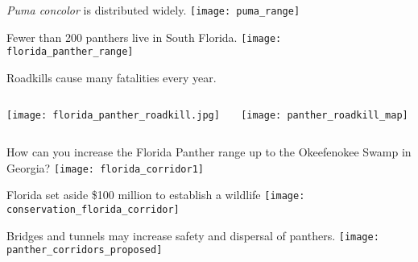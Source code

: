 \documentclass[t]{beamer}
\begin{document}
{
\begin{frame}[plain]
\end{frame}
}

\begin{frame}[plain]{\textit{Puma concolor} is distributed widely.}
	\centering%
		\texttt{[image: puma\_range]}
\end{frame}

%

\begin{frame}[plain]{Fewer than 200 panthers live in South Florida.}
	\centering%
		\texttt{[image: florida\_panther\_range]}
\end{frame}

\begin{frame}[plain]{Roadkills cause many fatalities every year.}
	\begin{columns}[T]%
		\begin{column}{0.4\textwidth}%
			\centering%
			\texttt{[image: florida\_panther\_roadkill.jpg]}
		\end{column}
		\begin{column}{0.55\textwidth}%
			\centering%
			\texttt{[image: panther\_roadkill\_map]}
		\end{column}
	\end{columns}
\end{frame}


{
\begin{frame}[plain]
\end{frame}
}

\begin{frame}[plain]{How can you increase the Florida Panther range up to the Okeefenokee Swamp in Georgia?}
	\centering%
		\texttt{[image: florida\_corridor1]}
\end{frame}

\begin{frame}[plain]{Florida set aside \$100 million to establish a wildlife }
	\centering%
		\texttt{[image: conservation\_florida\_corridor]}
\end{frame}


\begin{frame}[plain]{Bridges and tunnels may increase safety and dispersal of panthers.}
	\centering%
		\texttt{[image: panther\_corridors\_proposed]}
\end{frame}
\end{document}
